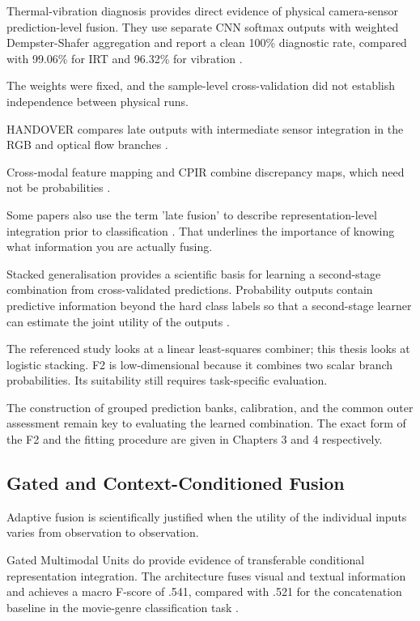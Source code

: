 Thermal-vibration diagnosis provides direct evidence of physical camera-sensor prediction-level
fusion. They use separate CNN softmax outputs with weighted Dempster-Shafer aggregation and report a
clean 100\% diagnostic rate, compared with 99.06\% for IRT and 96.32\% for vibration \parencite[Table~VII]{Huo2022Multisensor}.

The weights were fixed, and the sample-level cross-validation did not establish independence between
physical runs.

HANDOVER compares late outputs with intermediate sensor integration in the RGB and optical flow
branches \parencite[PDF pp.~5--7]{Thoduka2024Handover}.

Cross-modal feature mapping and CPIR combine discrepancy maps, which need not be probabilities
\parencite{Costanzino2024Multimodal,Shangguan2025CPIR}.

Some papers also use the term 'late fusion' to describe representation-level integration prior to
classification \parencite{Wang2020What}. That underlines the importance of knowing
what information you are actually fusing.

Stacked generalisation provides a scientific basis for learning a second-stage combination from
cross-validated predictions. Probability outputs contain predictive information beyond the hard
class labels so that a second-stage learner can estimate the joint utility of the outputs
\parencite[Sections~2--3]{Ting1999Issues}.

The referenced study looks at a linear least-squares combiner; this thesis looks at logistic
stacking. F2 is low-dimensional because it combines two scalar branch probabilities. Its suitability
still requires task-specific evaluation.

The construction of grouped prediction banks, calibration, and the common outer assessment remain
key to evaluating the learned combination. The exact form of the F2 and the fitting procedure are
given in Chapters 3 and 4 respectively.

\subsection{Gated and Context-Conditioned Fusion}

Adaptive fusion is scientifically justified when the utility of the individual inputs varies from
observation to observation.

Gated Multimodal Units do provide evidence of transferable conditional representation integration.
The architecture fuses visual and textual information and achieves a macro F-score of .541, compared
with .521 for the concatenation baseline in the movie-genre classification task \parencite[Section~3.1, Table~2]{P006}.

